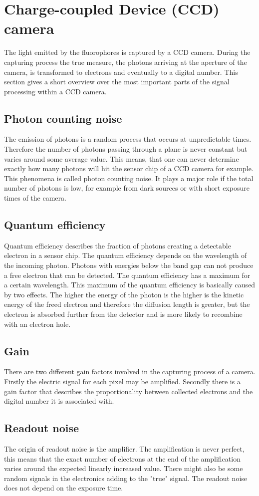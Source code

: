 \section{Charge-coupled Device (CCD) camera}
The light emitted by the fluorophores is captured by a CCD camera. During the capturing process the true measure, the photons arriving at the aperture of the camera, is transformed to electrons and eventually to a digital number. This section gives a short overview over the most important parts of the signal processing within a CCD camera.
\subsection{Photon counting noise}
The emission of photons is a random process that occurs at unpredictable times. Therefore the number of photons passing through a plane is never constant but varies around some average value. This means, that one can never determine exactly how many photons will hit the sensor chip of a CCD camera for example. This phenomena is called photon counting noise. It plays a major role if the total number of photons is low, for example from dark sources or with short exposure times of the camera.
\subsection{Quantum efficiency}
Quantum efficiency describes the fraction of photons creating a detectable electron in a sensor chip. The quantum efficiency depends on the wavelength of the incoming photon. Photons with energies below the band gap can not produce a free electron that can be detected. The quantum efficiency has a maximum for a certain wavelength. This maximum of the quantum efficiency is basically caused by two effects. The higher the energy of the photon is the higher is the kinetic energy of the freed electron and therefore the diffusion length is greater, but the electron is absorbed further from the detector and is more likely to recombine with an electron hole.
\subsection{Gain}
There are two different gain factors involved in the capturing process of a camera. Firstly the electric signal for each pixel may be amplified. Secondly there is a gain factor that describes the proportionality between collected electrons and the digital number it is associated with.
\subsection{Readout noise}
The origin of readout noise is the amplifier. The amplification is never perfect, this means that the exact number of electrons at the end of the amplification varies around the expected linearly increased value. There might also be some random signals in the electronics adding to the "true" signal. The readout noise does not depend on the exposure time.

